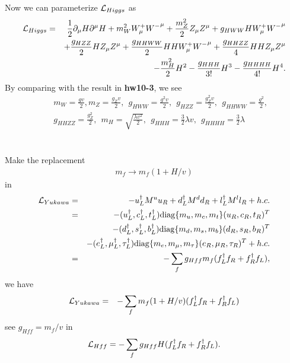 \documentclass[11pt]{article}
\def\del{{\partial}}
\begin{document}
\section{ }
Now we can parameterize ${\cal L}_{Higgs}$ as
\begin{eqnarray}
    {\cal L}_{Higgs} &=& \frac{1}{2} \del_\mu H \del^\mu H+
                m_W^2 W^+_\mu {W^-}^\mu
                + \frac{m_Z^2}{2} Z_\mu Z^\mu
                + g_{HWW} H W^+_\mu {W^-}^\mu
                \nonumber \\ &&+ \frac{g_{HZZ}}{2} H Z_\mu Z^\mu
                + \frac{g_{HHWW}}{2} HH W^+_\mu {W^-}^\mu
                + \frac{g_{HHZZ}}{4} HH Z_\mu Z^\mu
                \nonumber \\ &&- \frac{m_H^2}{2} H^2
                - \frac{g_{HHH}}{3!} H^3
                - \frac{g_{HHHH}}{4!} H^4.
  \end{eqnarray}
By comparing with the result in {\bf hw10-3}, we see
\begin{eqnarray}
    &&m_W= \frac{gv}{2}, m_Z=\frac{g_Zv}{2},~~ g_{HWW}=\frac{g^2v}{2},~~g_{HZZ}=\frac{g_Z^2v}{2},~~g_{HHWW}= \frac{g^2}{2},\\
    && g_{HHZZ}=\frac{g_Z^2}{2},~~m_H=\sqrt{\frac{\lambda v^2}{2}},~~g_{HHH}=\frac{3}{2} \lambda v,~~g_{HHHH}=\frac{3}{2} \lambda
\end{eqnarray}

\section{ }
Make the replacement
\begin{eqnarray}
    m_f \to m_f (1+H/v)
  \end{eqnarray}
in
\begin{eqnarray}
    {\cal L}_{Yukawa} &=&
    -u_L^\dagger M^u u_R + d_L^\dagger M^d d_R + l_L^\dagger M^l l_R + h.c. \\
    &=&
    -(u_L^\dagger, c_L^\dagger, t_L^\dagger) {\rm diag}\{m_u,m_c,m_t\} (u_R,c_R,t_R)^T\nonumber \\
    &&-(d_L^\dagger, s_L^\dagger, b_L^\dagger) {\rm diag}\{m_d,m_s,m_b\} (d_R,s_R,b_R)^T \nonumber \\ &&- (e_L^\dagger, \mu_L^\dagger, \tau_L^\dagger) {\rm diag}\{m_e,m_\mu,m_\tau\} (e_R,\mu_R,\tau_R)^T
    +
    h.c. \\
    &=& - \sum_f g_{Hff} m_f (f_L^\dagger f_R + f_R^\dagger f_L),
  \end{eqnarray}
  we have
  \begin{eqnarray}
    {\cal L}_{Yukawa} &=& - \sum_f  m_f (1+H/v) (f_L^\dagger f_R + f_R^\dagger f_L)
 \end{eqnarray}
see $g_{Hff}=m_f/v$ in 
\begin{eqnarray}
    {\cal L}_{Hff} = - \sum_f g_{Hff} H (f_L^\dagger f_R + f_R^\dagger f_L).
\end{eqnarray}
\end{document}
